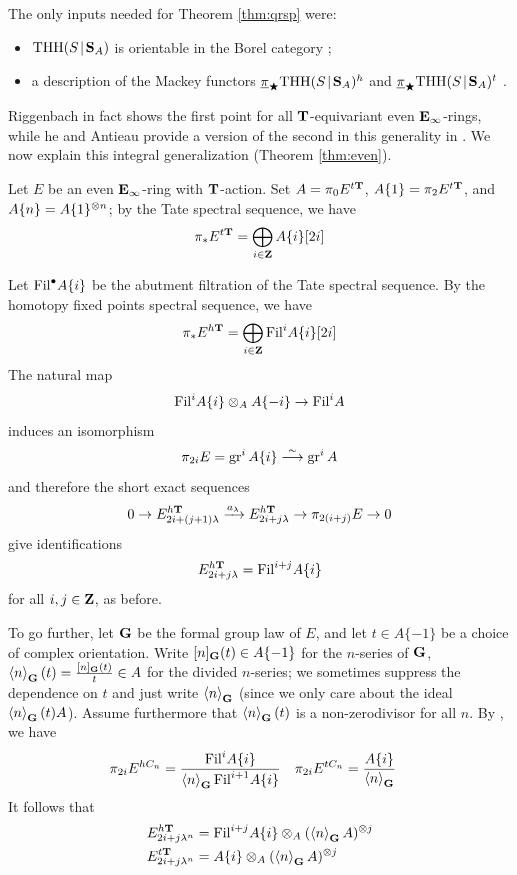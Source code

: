 \begin{remark}
  \label{rmk:even}
  The only inputs needed for Theorem \ref{thm:qrsp} were:
  \begin{itemize}
    \item $\mathrm{THH}(S\hspace{-1pt}\mathbin|\hspace{-1pt}\mathbf S_A)$ is orientable in the Borel category \cite[Proposition 4.2]{RiggenbachDoublePoints};
    \item a description of the Mackey functors $\underline\pi_\bigstar\mathrm{THH}(S\hspace{-1pt}\mathbin|\hspace{-1pt}\mathbf S_A)^h$ and $\underline\pi_\bigstar\mathrm{THH}(S\hspace{-1pt}\mathbin|\hspace{-1pt}\mathbf S_A)^t$ \cite[Corollary 3.3]{RiggenbachTruncated}.
  \end{itemize}
  Riggenbach in fact shows the first point for all $\mathbf T$-equivariant even $\mathbf E_\infty$-rings, while he and Antieau provide a version of the second in this generality in \cite[Corollary 3.20]{CycSyn}. We now explain this integral generalization (Theorem \ref{thm:even}).

  Let $E$ be an even $\mathbf E_\infty$-ring with $\mathbf T$-action. Set $A = \pi_0 E^{t\mathbf T}$, $A\{1\} = \pi_2 E^{t\mathbf T}$, and $A\{n\} = A\{1\}^{\otimes n}$; by the Tate spectral sequence, we have
  \[ \pi_* E^{t\mathbf T} = \bigoplus_{i\in\mathbf Z} A\{i\}[2i] \]

  Let $\mathrm{Fil}^\bullet A\{i\}$ be the abutment filtration of the Tate spectral sequence. By the homotopy fixed points spectral sequence, we have
  \[ \pi_* E^{h\mathbf T} = \bigoplus_{i\in \mathbf Z} \mathrm{Fil}^i A\{i\}[2i] \]
  The natural map
  \[
    \mathrm{Fil}^i A\{i\} \otimes_A A\{-i\} \to \mathrm{Fil}^i A
  \]
  induces an isomorphism
  \[ \pi_{2i} E = \operatorname{gr}^i A\{i\} \overset\sim\longrightarrow \operatorname{gr}^i A \]
  and therefore the short exact sequences
  \[ 0 \to E^{h\mathbf T}_{2i+(j+1)\lambda}\xrightarrow{a_\lambda} E^{h\mathbf T}_{2i+j\lambda} \to \pi_{2(i+j)} E \to 0 \]
  give identifications
  \[ E^{h\mathbf T}_{2i+j\lambda} = \mathrm{Fil}^{i+j}A\{i\} \]
  for all $i,j\in\mathbf Z$, as before.

  To go further, let $\mathbf G$ be the formal group law of $E$, and let $t\in A\{-1\}$ be a choice of complex orientation. Write $[n]_\mathbf G(t)\in A\{-1\}$ for the $n$-series of $\mathbf G$, $\left\langle n\right\rangle_\mathbf G(t) = \frac{[n]_\mathbf G(t)}{t} \in A$ for the divided $n$-series; we sometimes suppress the dependence on $t$ and just write $\left\langle n\right\rangle_\mathbf G$ (since we only care about the ideal $\left\langle n\right\rangle_\mathbf G(t)A$). Assume furthermore that $\left\langle n\right\rangle_\mathbf G(t)$ is a non-zerodivisor for all $n$. By \cite[Corollary 3.20]{CycSyn}, we have
  \begin{align*}
    \pi_{2i} E^{hC_n} &= \frac{\mathrm{Fil}^i A\{i\}}{\left\langle n\right\rangle_\mathbf G\mathrm{Fil}^{i+1}A\{i\}} &
    \pi_{2i}E^{tC_n} &= \frac{A\{i\}}{\left\langle n\right\rangle_\mathbf G}
  \end{align*}
  It follows that
  \begin{align*}
    E^{h\mathbf T}_{2i+j\lambda^n} &= \mathrm{Fil}^{i+j} A\{i\} \otimes_A (\left\langle n\right\rangle_\mathbf G A)^{\otimes j}\\
    E^{t\mathbf T}_{2i+j\lambda^n} &= A\{i\} \otimes_A (\left\langle n\right\rangle_\mathbf G A)^{\otimes j}
  \end{align*}


\end{remark}
